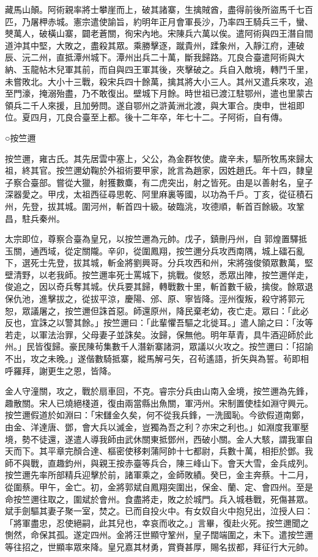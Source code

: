 \begin{pinyinscope}
藏馬山顛。阿術親率將士攀崖而上，破其諸寨，生擒賊酋，盡得前後所盜馬千七百匹，乃屠柙赤城。憲宗遣使諭旨，約明年正月會軍長沙，乃率四王騎兵三千，蠻、僰萬人，破橫山寨，闢老蒼關，徇宋內地。宋陳兵六萬以俟。遣阿術與四王潛自間道沖其中堅，大敗之，盡殺其眾。乘勝擊逐，蹴貴州，蹂象州，入靜江府，連破辰、沅二州，直抵潭州城下。潭州出兵二十萬，斷我歸路。兀良合臺遣阿術與大納、玉龍帖木兒軍其前，而自與四王軍其後，夾擊破之。兵自入敵境，轉鬥千里，未嘗敗北。大小十三戰，殺宋兵四十餘萬，擒其將大小三人。其州又遣兵來攻，追至門濠，掩溺殆盡，乃不敢復出。壁城下月餘。時世祖已渡江駐鄂州，遣也里蒙古領兵二千人來援，且加勞問。遂自鄂州之滸黃洲北渡，與大軍合。庚申，世祖即位。夏四月，兀良合臺至上都。後十二年卒，年七十二。子阿術，自有傳。



 ○按竺邇



 按竺邇，雍古氏。其先居雲中塞上，父公，為金群牧使。歲辛未，驅所牧馬來歸太祖，終其官。按竺邇幼鞠於外祖術要甲家，訛言為趙家，因姓趙氏。年十四，隸皇子察合臺部。嘗從大獵，射獲數麋，有二虎突出，射之皆死。由是以善射名，皇子深器愛之。甲戌，太祖西征尋思乾、阿里麻裏等國，以功為千戶。丁亥，從征積石州，先登，拔其城。圍河州，斬首四十級。破臨洮，攻德順，斬首百餘級。攻鞏昌，駐兵秦州。



 太宗即位，尊察合臺為皇兄，以按竺邇為元帥。戊子，鎮刪丹州，自郭煌置驛抵玉關，通西域，從定關隴。辛卯，從圍鳳翔，按竺邇分兵攻西南隅，城上礌石亂下，選死士先登，拔其城，斬金將劉興哥。分兵攻西和州，宋將強俊領眾數萬，堅壁清野，以老我師。按竺邇率死士罵城下，挑戰。俊怒，悉眾出陣，按竺邇佯走，俊追之，因以奇兵奪其城。伏兵要其歸，轉戰數十里，斬首數千級，擒俊。餘眾退保仇池，進擊拔之，從拔平涼，慶陽、邠、原、寧皆降。涇州復叛，殺守將郭元恕，眾議屠之，按竺邇但誅首惡。師還原州，降民棄老幼，夜亡走。眾曰：「此必反也，宜誅之以警其餘。」按竺邇曰：「此輩懼吾驅之北徙耳。」遣人諭之曰：「汝等若走，以軍法治罪，父母妻子並誅矣。汝歸，保無他。明年草青，具牛酒迎師於此州。」民皆復歸。豪民陳茍集數千人潛新寨諸洞，眾議以火攻之。按竺邇曰：「招諭不出，攻之未晚。」遂偕數騎抵寨，縱馬解弓矢，召茍遙語，折矢與為誓。茍即相呼羅拜，謝更生之恩，皆降。



 金人守潼關，攻之，戰於扇車回，不克。睿宗分兵由山南入金境，按竺邇為先鋒，趣散關。宋人已燒絕棧道，復由兩當縣出魚關，軍沔州。宋制置使桂如淵守興元。按竺邇假道於如淵曰：「宋讎金久矣，何不從我兵鋒，一洗國恥。今欲假道南鄭，由金、洋達唐、鄧，會大兵以滅金，豈獨為吾之利？亦宋之利也。」如淵度我軍壓境，勢不徒還，遂遣人導我師由武休關東抵鄧州，西破小關。金人大駭，謂我軍自天而下。其平章完顏合達、樞密使移剌蒲阿帥十七都尉，兵數十萬，相拒於鄧。我師不與戰，直趣鈞州，與親王按赤臺等兵合，陳三峰山下。會天大雪，金兵成列。按竺邇先率所部精兵迎擊於前，諸軍乘之，金師敗績。癸巳，金主奔蔡。十二月，從圍蔡。甲午，金亡。初，金將郭斌自鳳翔突圍出，保金、蘭、定、會四州。至是命按竺邇往取之，圍斌於會州。食盡將走，敗之於城門。兵入城巷戰，死傷甚眾。斌手劍驅其妻子聚一室，焚之。已而自投火中。有女奴自火中抱兒出，泣授人曰：「將軍盡忠，忍使絕嗣，此其兒也，幸哀而收之。」言畢，復赴火死。按竺邇聞之惻然，命保其孤。遂定四州。金將汪世顯守鞏州，皇子闊端圍之，未下。遣按竺邇等往招之，世顯率眾來降。皇兄嘉其材勇，賞賚甚厚，賜名拔都，拜征行大元帥。




\end{pinyinscope}
